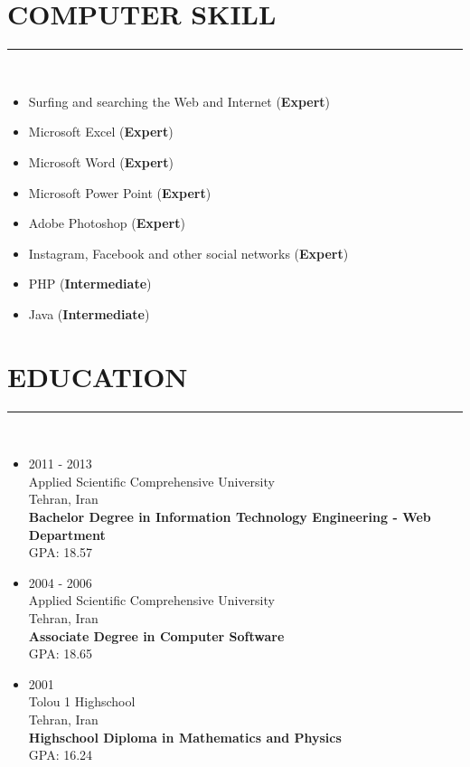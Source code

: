 \documentclass[10pt,a4paper]{article}
\begin{document}
\section{COMPUTER SKILL}
\noindent \rule {5.6cm}{0.4pt} \\
\begin{itemize}
  \item Surfing and searching the Web and Internet (\textbf{Expert})
  \item Microsoft Excel (\textbf{Expert})
  \item Microsoft Word (\textbf{Expert})
  \item Microsoft Power Point (\textbf{Expert})
  \item Adobe Photoshop (\textbf{Expert})
  \item Instagram, Facebook and other social networks (\textbf{Expert})
  \item PHP (\textbf{Intermediate})
  \item Java (\textbf{Intermediate})
\end{itemize}
    
\section{EDUCATION}
\noindent \rule {5.6cm}{0.4pt} \\
  \begin{itemize}
    \item \small 2011 - 2013 \\
                  Applied Scientific Comprehensive University \\
                  Tehran, Iran \\
                  \textbf{Bachelor Degree in Information Technology Engineering - Web Department} \\
                  GPA: 18.57
  \end{itemize}
  \begin{itemize}
    \item \small 2004 - 2006 \\
                  Applied Scientific Comprehensive University \\
                  Tehran, Iran \\
                  \textbf{Associate Degree in Computer Software} \\
                  GPA: 18.65
  \end{itemize}
  \begin{itemize}
    \item \small 2001 \\
                  Tolou 1 Highschool \\
                  Tehran, Iran \\
                  \textbf{Highschool Diploma in Mathematics and Physics} \\
                  GPA: 16.24
  \end{itemize}
\end{document}
